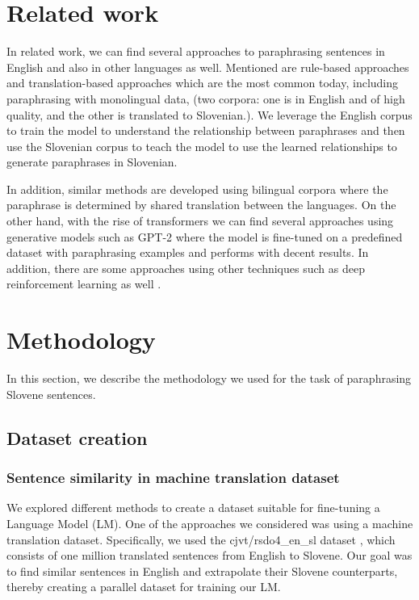 \documentclass[fleqn,moreauthors,10pt]{ds_report}
\begin{document}
\section*{Related work}
In related work, we can find several approaches to paraphrasing sentences in English and also in other languages as well. Mentioned are rule-based approaches \cite{mckeown-1979-paraphrasing} and translation-based approaches \cite{10.3115/1073012.1073020} which are the most common today, including paraphrasing with monolingual data, (two corpora: one is in English and of high quality, and the other is translated to Slovenian.). We leverage the English corpus to train the model to understand the relationship between paraphrases and then use the Slovenian corpus to teach the model to use the learned relationships to generate paraphrases in Slovenian.
\par
In addition, similar methods are developed using bilingual corpora \cite{mallinson-etal-2017-paraphrasing} where the paraphrase is determined by shared translation between the languages. On the other hand, with the rise of transformers \cite{vaswani2017attention} we can find several approaches using generative models such as GPT-2 \cite{DBLP:journals/corr/abs-1911-09661} where the model is fine-tuned on a predefined dataset with paraphrasing examples and performs with decent results. In addition, there are some approaches using other techniques such as deep reinforcement learning as well \cite{li-etal-2018-paraphrase}.


\section*{Methodology}

In this section, we describe the methodology we used for the task of paraphrasing Slovene sentences.

\subsection*{Dataset creation}

\subsubsection*{Sentence similarity in machine translation dataset}
We explored different methods to create a dataset suitable for fine-tuning a Language Model (LM). One of the approaches we considered was using a machine translation dataset. Specifically, we used the cjvt/rsdo4\_en\_sl dataset \cite{rsdo4_en_sl}, which consists of one million translated sentences from English to Slovene. Our goal was to find similar sentences in English and extrapolate their Slovene counterparts, thereby creating a parallel dataset for training our LM.
\end{document}
